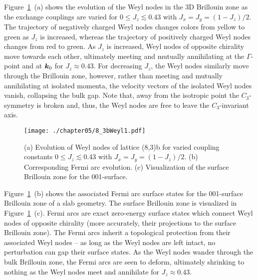 Figure~\ref{fig:chapter05_8_3bWeyl1}~(a) shows the evolution of the Weyl nodes in the 3D Brillouin zone as the exchange couplings are varied for $0 \leq J_z \lesssim 0.43$ with $J_x = J_y = (1 - J_z)/2$.
The trajectory of negatively charged Weyl nodes changes colors from yellow to green as $J_z$ is increased, whereas the trajectory of positively charged Weyl nodes changes from red to green.
As $J_z$ is increased, Weyl nodes of opposite chirality move towards each other, ultimately meeting and mutually annihilating at the $\Gamma$-point and at $\bm{k}_0$ for $J_z \approx 0.43$.
For decreasing $J_z$, the Weyl nodes similarly move through the Brillouin zone, however, rather than meeting and mutually annihilating at isolated momenta, the velocity vectors of the isolated Weyl nodes vanish, collapsing the bulk gap.
Note that, away from the isotropic point the $C_3$-symmetry is broken and, thus, the Weyl nodes are free to leave the $C_3$-invariant axis.
%
\begin{figure}[tb]
	\centering
	\texttt{[image: ./chapter05/8\_3bWeyl1.pdf]}
	\caption{
		(a) Evolution of Weyl nodes of lattice (8,3)b for varied coupling constants $0 \leq J_z \lesssim 0.43$ with $J_x = J_y = (1 - J_z)/2$.
		(b) Corresponding Fermi arc evolution.
		(c) Visualization of the surface Brillouin zone for the 001-surface.
	}
	\label{fig:chapter05_8_3bWeyl1}
\end{figure}
%

Figure~\ref{fig:chapter05_8_3bWeyl1}~(b) shows the associated Fermi arc surface states for the 001-surface Brillouin zone of a slab geometry.
The surface Brillouin zone is visualized in Figure~\ref{fig:chapter05_8_3bWeyl1}~(c).
Fermi arcs are exact zero-energy surface states which connect Weyl nodes of opposite chirality (more accurately, their projections to the surface Brillouin zone).
The Fermi arcs inherit a topological protection from their associated Weyl nodes -- as long as the Weyl nodes are left intact, no perturbation can gap their surface states.
As the Weyl nodes wander through the bulk Brillouin zone, the Fermi arcs are seen to deform, ultimately shrinking to nothing as the Weyl nodes meet and annihilate for $J_z \approx 0.43$.

